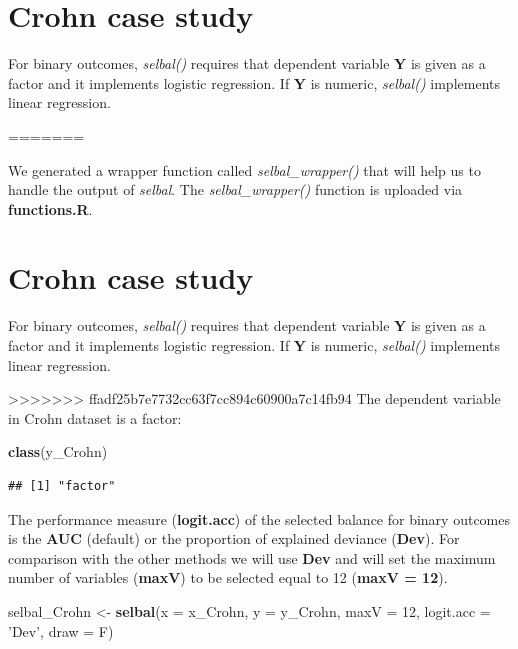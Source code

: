 \documentclass[openany]{book}
\newenvironment{Shaded}{\begin{snugshade}}{\end{snugshade}}
\newcommand{\KeywordTok}[1]{\textcolor[rgb]{0.13,0.29,0.53}{\textbf{#1}}}
\newcommand{\DataTypeTok}[1]{\textcolor[rgb]{0.13,0.29,0.53}{#1}}
\newcommand{\DecValTok}[1]{\textcolor[rgb]{0.00,0.00,0.81}{#1}}
\newcommand{\StringTok}[1]{\textcolor[rgb]{0.31,0.60,0.02}{#1}}
\newcommand{\NormalTok}[1]{#1}
\begin{document}
\section{Crohn case study}\label{crohn-case-study}

For binary outcomes, \emph{selbal()} requires that dependent variable
\textbf{Y} is given as a factor and it implements logistic regression.
If \textbf{Y} is numeric, \emph{selbal()} implements linear regression.

=======

We generated a wrapper function called \emph{selbal\_wrapper()} that
will help us to handle the output of \emph{selbal}. The
\emph{selbal\_wrapper()} function is uploaded via \textbf{functions.R}.

\section{Crohn case study}\label{crohn-case-study}

For binary outcomes, \emph{selbal()} requires that dependent variable
\textbf{Y} is given as a factor and it implements logistic regression.
If \textbf{Y} is numeric, \emph{selbal()} implements linear regression.

>>>>>>> ffadf25b7e7732cc63f7cc894c60900a7c14fb94
The dependent variable in Crohn dataset is a factor:

\begin{Shaded}
\begin{Highlighting}[]
\KeywordTok{class}\NormalTok{(y_Crohn)}
\end{Highlighting}
\end{Shaded}

\begin{verbatim}
## [1] "factor"
\end{verbatim}

The performance measure (\textbf{logit.acc}) of the selected balance for
binary outcomes is the \textbf{AUC} (default) or the proportion of
explained deviance (\textbf{Dev}). For comparison with the other methods
we will use \textbf{Dev} and will set the maximum number of variables
(\textbf{maxV}) to be selected equal to 12 (\textbf{maxV = 12}).

\begin{Shaded}
\begin{Highlighting}[]
\NormalTok{selbal_Crohn <-}\StringTok{ }\KeywordTok{selbal}\NormalTok{(}\DataTypeTok{x =}\NormalTok{ x_Crohn, }\DataTypeTok{y =}\NormalTok{ y_Crohn, }\DataTypeTok{maxV =} \DecValTok{12}\NormalTok{, }
                       \DataTypeTok{logit.acc =} \StringTok{'Dev'}\NormalTok{, }\DataTypeTok{draw =}\NormalTok{ F)}
\end{Highlighting}
\end{Shaded}
\end{document}
